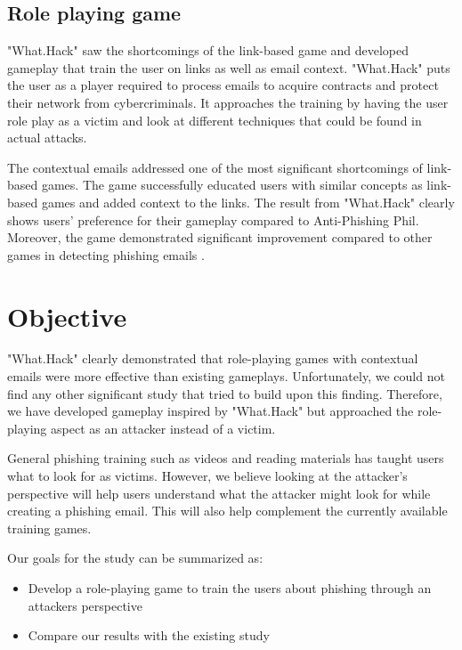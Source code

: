 \subsection{Role playing game}
"What.Hack" \cite{what_hack} saw the shortcomings of the link-based game and developed gameplay that train the user on links as well as email context. "What.Hack" puts the user as a player required to process emails to acquire contracts and protect their network from cybercriminals. It approaches the training by having the user role play as a victim and look at different techniques that could be found in actual attacks.

The contextual emails addressed one of the most significant shortcomings of link-based games. The game successfully educated users with similar concepts as link-based games and added context to the links. The result from "What.Hack" clearly shows users' preference for their gameplay compared to Anti-Phishing Phil. Moreover, the game demonstrated significant improvement compared to other games in detecting phishing emails \cite{what_hack}.

\section{Objective}
"What.Hack" clearly demonstrated that role-playing games with contextual emails were more effective than existing gameplays. Unfortunately, we could not find any other significant study that tried to build upon this finding. Therefore, we have developed gameplay inspired by "What.Hack" but approached the role-playing aspect as an attacker instead of a victim.

General phishing training such as videos and reading materials has taught users what to look for as victims. However, we believe looking at the attacker's perspective will help users understand what the attacker might look for while creating a phishing email. This will also help complement the currently available training games.

Our goals for the study can be summarized as:

\begin{itemize}
    \setlength\itemsep{-0.6em}
    \item Develop a role-playing game to train the users about phishing through an attackers perspective
    \item Compare our results with the existing study
\end{itemize}
